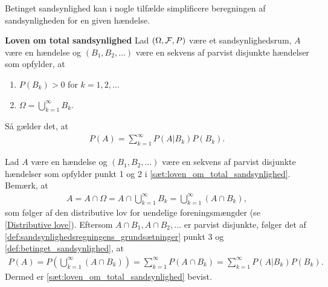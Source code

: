 Betinget sandsynlighed kan i nogle tilfælde simplificere beregningen af sandsynligheden for en given hændelse. 

\begin{minipage}\textwidth
\begin{thmx} \textbf{Loven om total sandsynlighed} \label{sæt:loven_om_total_sandsynlighed} %
\newline
Lad $(\Omega, \mathcal{F}, P)$ være et sandsynlighedsrum, $A$ være en hændelse og $(B_1,B_2,\ldots)$ være en sekvens af parvist disjunkte hændelser som opfylder, at
\begin{enumerate}
\item $P(B_k)>0$ for $k = 1, 2, \ldots$
\item $\Omega=\displaystyle\bigcup_{k=1}^\infty B_k$.
\end{enumerate}
Så gælder det, at
\begin{align*}
    P(A)=\sum_{k = 1}^\infty P(A|B_k)P(B_k).
\end{align*}
\end{thmx}
\end{minipage}
\begin{bev} \textbf{} %
\newline
Lad $A$ være en hændelse og $(B_1,B_2,\ldots)$ være en sekvens af parvist disjunkte hændelser som opfylder punkt 1 og 2 i \autoref{sæt:loven_om_total_sandsynlighed}. Bemærk, at
\begin{align*}
    A=A\cap \Omega=A\cap\bigcup_{k=1}^\infty B_k=\bigcup_{k=1}^\infty(A\cap B_k),
\end{align*}
som følger af den distributive lov for uendelige foreningsmængder (se \autoref{Distributive love}). 
Eftersom $A\cap B_1,A\cap B_2,\dots$ er parvist disjunkte, følger det af \autoref{def:sandsynlighedsregningens_grundsætninger} punkt 3 og \autoref{def:betinget_sandsynlighed}, at
\begin{align*}
    P(A)=P\left(\bigcup_{k=1}^\infty(A\cap B_k)\right) =\sum_{k=1}^\infty P(A\cap B_k)=\sum_{k=1}^\infty P(A|B_k)P(B_k).
\end{align*}
Dermed er \autoref{sæt:loven_om_total_sandsynlighed} bevist.
\end{bev}

